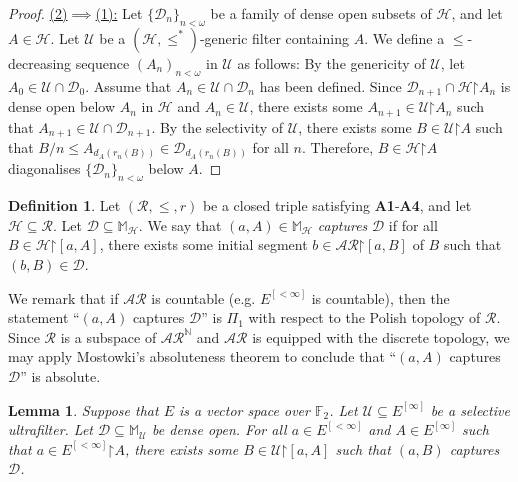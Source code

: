 \documentclass[10pt,a4paper]{amsart}
\theoremstyle{plain}
\numberwithin{equation}{section}
\newtheorem{lemma}[theorem]{Lemma}
\theoremstyle{definition}
\newtheorem{definition}[theorem]{Definition}
\newcommand{\N}{\mathbb{N}}
\newcommand{\cal}{\mathcal}
\newcommand{\restrictedto}{\mathord{\upharpoonright}}
\newcommand{\U}{\cal{U}}
\renewcommand{\H}{\cal{H}}
\newcommand{\D}{\cal{D}}
\begin{document}
\begin{proof}
    \underline{(2)$\implies$(1):} Let $\{\D_n\}_{n<\omega}$ be a family of dense open subsets of $\H$, and let $A \in \H$. Let $\U$ be a $(\H,\leq^*)$-generic filter containing $A$. We define a $\leq$-decreasing sequence $(A_n)_{n<\omega}$ in $\U$ as follows: By the genericity of $\U$, let $A_0 \in \U \cap \D_0$. Assume that $A_n \in \U \cap \D_n$ has been defined. Since $\D_{n+1} \cap \H\restrictedto A_n$ is dense open below $A_n$ in $\H$ and $A_n \in \U$, there exists some $A_{n+1} \in \U\restrictedto A_n$ such that $A_{n+1} \in \U \cap \D_{n+1}$. By the selectivity of $\U$, there exists some $B \in \U\restrictedto A$ such that $B/n \leq A_{d_A(r_n(B))} \in \D_{d_A(r_n(B))}$ for all $n$. Therefore, $B \in \H\restrictedto A$ diagonalises $\{\D_n\}_{n<\omega}$ below $A$.
\end{proof}

\begin{definition}
\label{def:capture.dense.set}
    Let $(\cal{R},\leq,r)$ be a closed triple satisfying \textbf{A1}-\textbf{A4}, and let $\H \subseteq \cal{R}$. Let $\D \subseteq \mathbb{M}_\H$. We say that $(a,A) \in \mathbb{M}_\H$ \emph{captures} $\D$ if for all $B \in \H\restrictedto[a,A]$, there exists some initial segment $b \in \cal{AR}\restrictedto[a,B]$ of $B$ such that $(b,B) \in \D$.
\end{definition}

We remark that if $\cal{AR}$ is countable (e.g. $E^{[<\infty]}$ is countable), then the statement ``$(a,A)$ captures $\D$'' is $\Pi_1$ with respect to the Polish topology of $\cal{R}$. Since $\cal{R}$ is a subspace of $\cal{AR}^\N$ and $\cal{AR}$ is equipped with the discrete topology, we may apply Mostowki's absoluteness theorem to conclude that ``$(a,A)$ captures $\D$'' is absolute.

\begin{lemma}
\label{lem:capturing.possible}
    Suppose that $E$ is a vector space over $\mathbb{F}_2$. Let $\U \subseteq E^{[\infty]}$ be a selective ultrafilter. Let $\D \subseteq \mathbb{M}_\U$ be dense open. For all $a \in E^{[<\infty]}$ and $A \in E^{[\infty]}$ such that $a \in E^{[<\infty]}\restrictedto A$, there exists some $B \in \U\restrictedto[a,A]$ such that $(a,B)$ captures $\D$.
\end{lemma}
\end{document}
